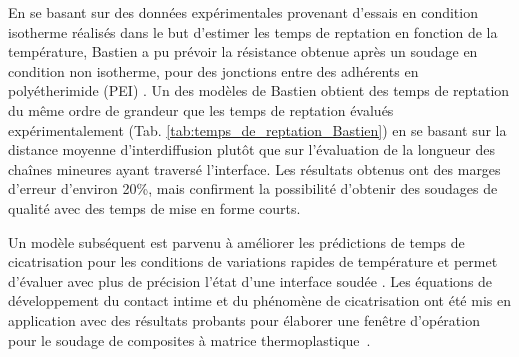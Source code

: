 En se basant sur des données expérimentales provenant d'essais en condition isotherme réalisés dans le but d'estimer les temps de reptation en fonction de la température, Bastien a pu prévoir la résistance obtenue après un soudage en condition non isotherme, pour des jonctions entre des adhérents en polyétherimide (PEI) \cite{Bastien1991}. 
Un des modèles de Bastien obtient des temps de reptation du même ordre de grandeur que les temps de reptation évalués expérimentalement (Tab. \ref{tab:temps_de_reptation_Bastien}) en se basant sur la distance moyenne d'interdiffusion plutôt que sur l'évaluation de la longueur des chaînes mineures ayant traversé l'interface. 
Les résultats obtenus ont des marges d'erreur d'environ 20\%, mais confirment la possibilité d'obtenir des soudages de qualité avec des temps de mise en forme courts.

\begin{table}[h]
	\centering
	\caption{Évaluation expérimentale des temps de reptation et comparaison avec les résultats des modèles}
	\label{tab:temps_de_reptation_Bastien}
\end{table}

Un modèle subséquent est parvenu à améliorer les prédictions de temps de cicatrisation pour les conditions de variations rapides de température et permet d'évaluer avec plus de précision l'état d'une interface soudée \cite{F.Yang2002}. 
Les équations de développement du contact intime et du phénomène de cicatrisation ont été mis en application avec des résultats probants pour élaborer une fenêtre d'opération pour le soudage de composites à matrice thermoplastique~\cite{Ageorges1998}. 

